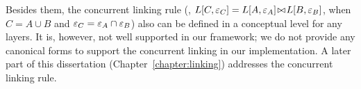 Besides them, 
the concurrent linking rule (\ie, $L[C, {\varepsilon}_C] = {L[A, {\varepsilon}_A]} \!\bowtie\! {L[B, {\varepsilon}_B]}$, when $C = A \cup B$ and ${\varepsilon}_C = {\varepsilon}_A \cap {\varepsilon}_B$)  
also can be defined in a conceptual level for any layers.
It is, however, not well supported in our framework; we do not provide
any canonical forms to support the concurrent linking
in our implementation.
A later part of this dissertation (Chapter~\ref{chapter:linking}) addresses the concurrent linking rule.



